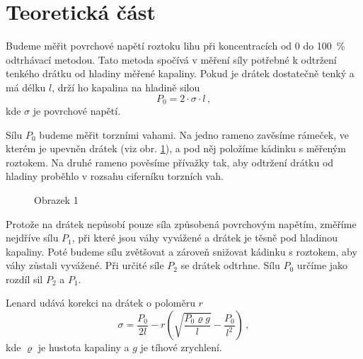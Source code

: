 \section*{Teoretická část}
Budeme měřit povrchové napětí roztoku lihu při koncentracích od 0 do \SI{100}{\percent} odtrhávací metodou.
Tato metoda spočívá v měření síly potřebné k odtržení tenkého drátku od hladiny měřené kapaliny.
Pokud je drátek dostatečně tenký a má délku $l$, drží ho kapalina na hladině silou \cite{ZFP}
\begin{equation} \label{eq::p0sigma}
P_0=2 \cdot \sigma \cdot l \,,
\end{equation}
kde $\sigma$ je povrchové napětí.

Sílu $P_0$ budeme měřit torzními vahami.
Na jedno rameno zavěsíme rámeček, ve kterém je upevněn drátek (viz obr. \ref{obr::ramecek}), a pod něj položíme kádinku s měřeným roztokem.
Na druhé rameno pověsíme přívažky tak, aby odtržení drátku od hladiny proběhlo v rozsahu ciferníku torzních vah.

\begin{figure}[htbp]
\centering
\caption{Obrazek 1}
\label{obr::ramecek}
\end{figure}

Protože na drátek nepůsobí pouze síla způsobená povrchovým napětím, změříme nejdříve sílu $P_1$, při které jsou váhy vyvážené a drátek je těsně pod hladinou kapaliny.
Poté budeme sílu zvětšovat a zároveň snižovat kádinku s roztokem, aby váhy zůstali vyvážené.
Při určité síle $P_2$ se drátek odtrhne.
Sílu $P_0$ určíme jako rozdíl sil $P_2$ a $P_1$.

Lenard \cite{oprava} udává korekci na drátek o poloměru $r$
\begin{equation} \label{eq::lenard}
\sigma = \frac{P_0}{2l} - r\left( \sqrt{\frac{P_0 \varrho g}{l}} - \frac{P_0}{l^2} \right) \,,
\end{equation}
kde $\varrho$ je hustota kapaliny a $g$ je tíhové zrychlení.